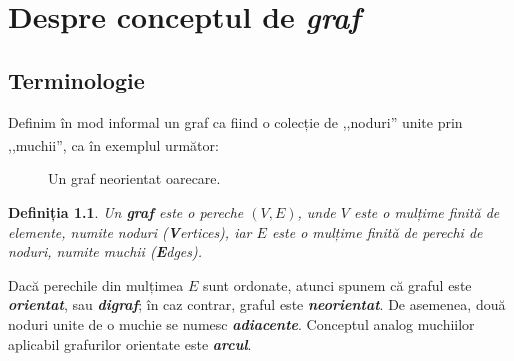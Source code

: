 \documentclass[9pt,a4paper]{report}
\newtheorem{definitie}{Definiția}
\begin{document}
\newpage

\tableofcontents
\thispagestyle{empty}

\newpage
\setcounter{page}{1}

\chapter{Despre conceptul de \textit{graf}}
\section{Terminologie}

Definim în mod informal un graf ca fiind o colecție de ,,noduri'' unite prin ,,muchii'', ca în exemplul\textsuperscript{\cite{gabow}} următor:

\begin{figure}[htbp]
    \centering
    \caption{Un graf neorientat oarecare.}
    \label{fig:graf1}
\end{figure}

\begin{definitie}
    Un \textbf{graf} este o pereche $(V,E)$, unde $V$ este o mulțime finită de elemente, numite \textit{noduri (\textbf{V}ertices)}, iar $E$ este o mulțime finită de perechi de noduri, numite \textit{muchii (\textbf{E}dges)}.
\end{definitie}

Dacă perechile din mulțimea $E$ sunt ordonate, atunci spunem că graful este \textbf{\textit{orientat}}, sau \textbf{\textit{digraf}}; în caz contrar, graful este \textbf{\textit{neorientat}}. De asemenea, două noduri unite de o muchie se numesc \textit{\textbf{adiacente}}. Conceptul analog muchiilor aplicabil grafurilor orientate este \textbf{\textit{arcul}}.
\end{document}
